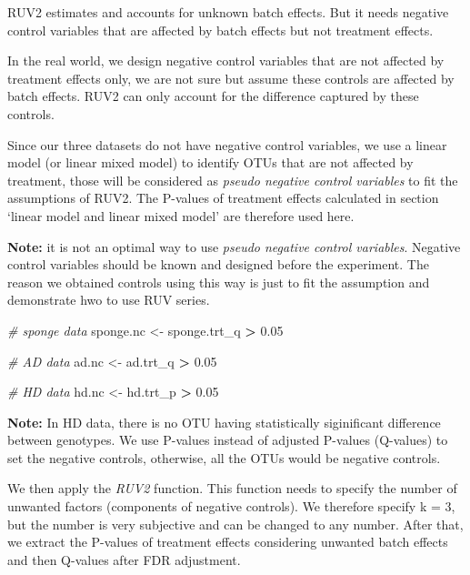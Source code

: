 \documentclass[]{book}
\newenvironment{Shaded}{\begin{snugshade}}{\end{snugshade}}
\newcommand{\FloatTok}[1]{\textcolor[rgb]{0.00,0.00,0.81}{#1}}
\newcommand{\StringTok}[1]{\textcolor[rgb]{0.31,0.60,0.02}{#1}}
\newcommand{\CommentTok}[1]{\textcolor[rgb]{0.56,0.35,0.01}{\textit{#1}}}
\newcommand{\OperatorTok}[1]{\textcolor[rgb]{0.81,0.36,0.00}{\textbf{#1}}}
\newcommand{\NormalTok}[1]{#1}
\begin{document}
RUV2 estimates and accounts for unknown batch effects. But it needs
negative control variables that are affected by batch effects but not
treatment effects.

In the real world, we design negative control variables that are not
affected by treatment effects only, we are not sure but assume these
controls are affected by batch effects. RUV2 can only account for the
difference captured by these controls.

Since our three datasets do not have negative control variables, we use
a linear model (or linear mixed model) to identify OTUs that are not
affected by treatment, those will be considered as \emph{pseudo negative
control variables} to fit the assumptions of RUV2. The P-values of
treatment effects calculated in section `linear model and linear mixed
model' are therefore used here.

\textbf{Note:} it is not an optimal way to use \emph{pseudo negative
control variables}. Negative control variables should be known and
designed before the experiment. The reason we obtained controls using
this way is just to fit the assumption and demonstrate hwo to use RUV
series.

\begin{Shaded}
\begin{Highlighting}[]
\CommentTok{# sponge data}
\NormalTok{sponge.nc <-}\StringTok{ }\NormalTok{sponge.trt_q }\OperatorTok{>}\StringTok{ }\FloatTok{0.05}

\CommentTok{# AD data}
\NormalTok{ad.nc <-}\StringTok{ }\NormalTok{ad.trt_q }\OperatorTok{>}\StringTok{ }\FloatTok{0.05}

\CommentTok{# HD data}
\NormalTok{hd.nc <-}\StringTok{ }\NormalTok{hd.trt_p }\OperatorTok{>}\StringTok{ }\FloatTok{0.05}
\end{Highlighting}
\end{Shaded}

\textbf{Note:} In HD data, there is no OTU having statistically
siginificant difference between genotypes. We use P-values instead of
adjusted P-values (Q-values) to set the negative controls, otherwise,
all the OTUs would be negative controls.

We then apply the \emph{RUV2} function. This function needs to specify
the number of unwanted factors (components of negative controls). We
therefore specify k = 3, but the number is very subjective and can be
changed to any number. After that, we extract the P-values of treatment
effects considering unwanted batch effects and then Q-values after FDR
adjustment.
\end{document}
